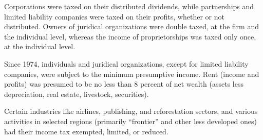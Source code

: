\documentclass[
  12pt]{article}
\theoremstyle{definition}
\theoremstyle{remark}
\begin{document}
Corporations were taxed on their distributed dividends, while
partnerships and limited liability companies were taxed on their
profits, whether or not distributed. Owners of juridical organizations
were double taxed, at the firm and the individual level, whereas the
income of proprietorships was taxed only once, at the individual level.

Since 1974, individuals and juridical organizations, except for limited
liability companies, were subject to the minimum presumptive income.
Rent (income and profits) was presumed to be no less than 8 percent of
net wealth (assets less depreciation, real estate, livestock,
securities).

Certain industries like airlines, publishing, and reforestation sectors,
and various activities in selected regions (primarily ``frontier'' and
other less developed ones) had their income tax exempted, limited, or
reduced.
\end{document}
